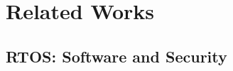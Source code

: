 \chapter{\leavevmode Related Works}
\label{chap:relatedworks}



\section{RTOS: Software and Security}

